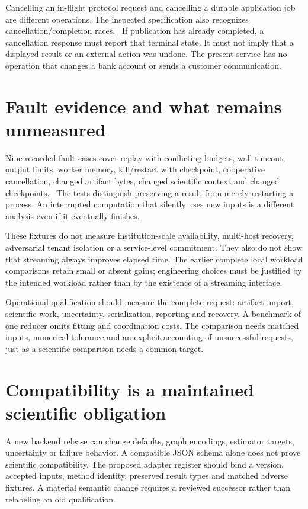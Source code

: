 Cancelling an in-flight protocol request and cancelling a durable application
job are different operations. The inspected specification also recognizes
cancellation/completion races.~\citep{v12_mcp_legacy_cancellation} If publication
has already completed, a cancellation response must report that terminal state.
It must not imply that a displayed result or an external action was undone.
The present service has no operation that changes a bank account or sends a
customer communication.

\section{Fault evidence and what remains unmeasured}

Nine recorded fault cases cover replay with conflicting budgets, wall timeout,
output limits, worker memory, kill/restart with checkpoint, cooperative
cancellation, changed artifact bytes, changed scientific context and changed
checkpoints.~\citep{v12_in_runtime} The tests distinguish preserving a result from
merely restarting a process. An interrupted computation that silently uses new
inputs is a different analysis even if it eventually finishes.

These fixtures do not measure institution-scale availability, multi-host
recovery, adversarial tenant isolation or a service-level commitment. They also
do not show that streaming always improves elapsed time. The earlier complete
local workload comparisons retain small or absent gains; engineering choices
must be justified by the intended workload rather than by the existence of a
streaming interface.

Operational qualification should measure the complete request: artifact import,
scientific work, uncertainty, serialization, reporting and recovery. A benchmark
of one reducer omits fitting and coordination costs. The comparison needs
matched inputs, numerical tolerance and an explicit accounting of unsuccessful
requests, just as a scientific comparison needs a common target.

\section{Compatibility is a maintained scientific obligation}

A new backend release can change defaults, graph encodings, estimator targets,
uncertainty or failure behavior. A compatible JSON schema alone does not prove
scientific compatibility. The proposed adapter register should bind a version,
accepted inputs, method identity, preserved result types and matched adverse
fixtures. A material semantic change requires a reviewed successor rather than
relabeling an old qualification.

